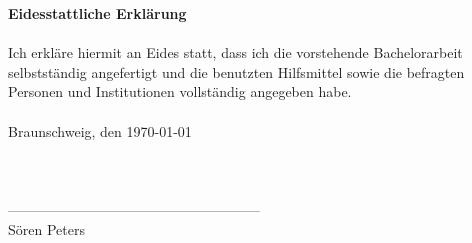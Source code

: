 \clearpage
\pagestyle{empty}
\textbf{Eidesstattliche Erkl\"arung}
\\
\\
Ich erkl\"are hiermit an Eides statt, dass ich die vorstehende Bachelorarbeit selbstst\"andig angefertigt und die benutzten Hilfsmittel sowie die befragten Personen und Institutionen vollst\"andig angegeben habe.\\
\\
Braunschweig, den \today\\
\\
\\
\\
------------------------------------------------------\\
S\"oren Peters